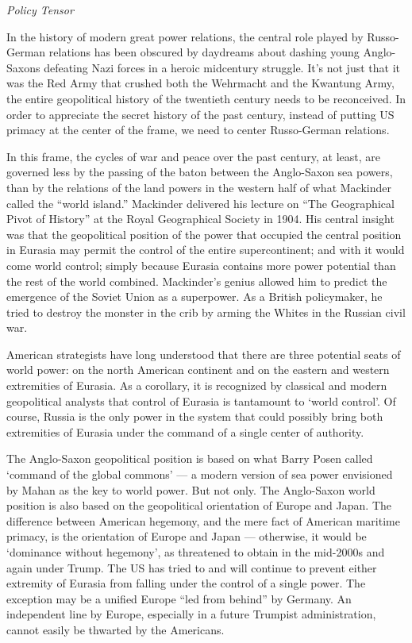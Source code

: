 \documentclass[
]{book}
\begin{document}
\emph{Policy Tensor}

In the history of modern great power relations, the central role played by Russo-German relations has been obscured by daydreams about dashing young Anglo-Saxons defeating Nazi forces in a heroic midcentury struggle. It's not just that it was the Red Army that crushed both the Wehrmacht and the Kwantung Army, the entire geopolitical history of the twentieth century needs to be reconceived. In order to appreciate the secret history of the past century, instead of putting US primacy at the center of the frame, we need to center Russo-German relations.

In this frame, the cycles of war and peace over the past century, at least, are governed less by the passing of the baton between the Anglo-Saxon sea powers, than by the relations of the land powers in the western half of what Mackinder called the ``world island.'' Mackinder delivered his lecture on ``The Geographical Pivot of History'' at the Royal Geographical Society in 1904. His central insight was that the geopolitical position of the power that occupied the central position in Eurasia may permit the control of the entire supercontinent; and with it would come world control; simply because Eurasia contains more power potential than the rest of the world combined. Mackinder's genius allowed him to predict the emergence of the Soviet Union as a superpower. As a British policymaker, he tried to destroy the monster in the crib by arming the Whites in the Russian civil war.

American strategists have long understood that there are three potential seats of world power: on the north American continent and on the eastern and western extremities of Eurasia. As a corollary, it is recognized by classical and modern geopolitical analysts that control of Eurasia is tantamount to `world control'. Of course, Russia is the only power in the system that could possibly bring both extremities of Eurasia under the command of a single center of authority.

The Anglo-Saxon geopolitical position is based on what Barry Posen called `command of the global commons' --- a modern version of sea power envisioned by Mahan as the key to world power. But not only. The Anglo-Saxon world position is also based on the geopolitical orientation of Europe and Japan. The difference between American hegemony, and the mere fact of American maritime primacy, is the orientation of Europe and Japan --- otherwise, it would be `dominance without hegemony', as threatened to obtain in the mid-2000s and again under Trump. The US has tried to and will continue to prevent either extremity of Eurasia from falling under the control of a single power. The exception may be a unified Europe ``led from behind'' by Germany. An independent line by Europe, especially in a future Trumpist administration, cannot easily be thwarted by the Americans.
\end{document}
